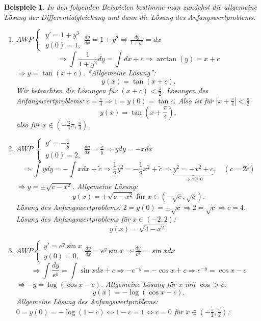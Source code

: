 \documentclass[12pt]{extreport} %
\theoremstyle{named}
\theoremstyle{nnamed}
\theoremstyle{itshape}
\theoremstyle{normal}
\newtheorem*{beispiele}{Beispiele}
\begin{document}
\begin{beispiele}
	In den folgenden Beispielen bestimme man zunächst die allgemeine Lösung der Differentialgleichung und dann die Lösung des Anfangswertproblems.
	\begin{enumerate}
		\item $AWP ~ \begin{cases} ~ y' = 1 + y^{3} \\ ~ y(0) = 1, \end{cases} \frac{dy}{dx} = 1 + y^{2} \Rightarrow \frac{dy}{1 + y^{2}} = dx$
			$$ \Longrightarrow \int \frac{1}{1 + y^{2}} dy = \int dx + c \Longrightarrow \arctan(y) = x + c $$
			$\Rightarrow y = \tan(x+c)$. \enquote{Allgemeine Lösung}:
			$$ y(x) = \tan ( x + c ). $$
			Wir betrachten die Lösungen für $(x+c) < \frac{\pi}{2}$. Lösungen des Anfangswertproblems: $c = \frac{\pi}{4} \Rightarrow 1 = y(0) = \tan c$. Also ist für $\left| x + \frac{\pi}{4} \right| < \frac{\pi}{2}$
			$$ y(x) = \tan \left( x + \frac{\pi}{4} \right), $$
			also für $x \in \left( - \frac{3}{4} \pi, \frac{\pi}{4} \right)$.
		\item $AWP ~ \begin{cases} ~ y' = - \frac{x}{y} \\ ~ y(0) = 2, \end{cases} \frac{dy}{dx} = \frac{x}{y} \Rightarrow y dy = - x dx$
			$$ \Longrightarrow \int y dy = - \int x dx + \tilde{c} \Longrightarrow  \frac{1}{2} y^{2} = - \frac{1}{2} x^{2} + \tilde{c} \Longrightarrow \underbrace{y^{2} = - x^{2} + c}_{\Rightarrow c \geq 0}, \quad (c = 2 \tilde{c}) $$
			$\Rightarrow y = \pm \sqrt{ c - x^{2} }$. Allgemeine Lösung: 
			$$ y(x) = \pm \sqrt{ c - x^{2} } \text{ für } x \in \left( -\sqrt{c}, \sqrt{c} \right). $$
			Lösung des Anfangswertproblems: $ 2 = y(0) = \pm \sqrt{c} \Rightarrow 2 = \sqrt{c} \Rightarrow c = 4$. Lösung des Anfangswertproblems für $x \in (-2, 2)$:
			$$ y(x) = \sqrt{4 - x^{2}}. $$
		\item $AWP ~ \begin{cases} y' = e^{y} \sin x \\ y(0) = 0, \end{cases} \frac{dy}{dx} = e^{y} \sin x \Rightarrow \frac{dy}{e^{y}} = \sin x dx$
			$$ \Longrightarrow \int \frac{dy}{e^{y}} = \int \sin x dx + c \Longrightarrow - e^{-y} = -\cos x + c \Rightarrow e^{-y} = \cos x - c $$
			$\Rightarrow - y = \log \left( \cos x - c \right)$. Allgemeine Lösung für $x$ mit $\cos > c$: 
			$$ y(x) = - \log (\cos x - c). $$ 
			Allgemeine Lösung des Anfangswertproblems: $0 = y(0) = - \log(1-c) \iff 1 - c = 1 \iff c = 0$ für $x \in \left( -\frac{\pi}{2}, \frac{\pi}{2} \right)$:

\end{enumerate}
\end{beispiele}
\end{document}
